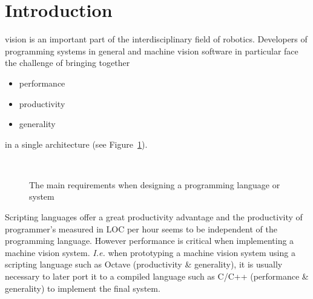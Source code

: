 \documentclass[10pt,journal,compsoc]{joser1}
\newcommand{\fig}[1]{Figure~\ref{fig:#1}}
\begin{document}
\maketitle

\section{Introduction}
 vision is an important part of the interdisciplinary
field of robotics. Developers of programming systems in general and machine
vision software in particular face the challenge of bringing together
\begin{itemize}
  \item performance
  \item productivity
  \item generality
\end{itemize}
in a single architecture (see \fig{triangle}).
\begin{figure}[htbp]
   \begin{center}
     \\
     \caption{The main requirements when designing a programming language or
     system \citep{wolczko2011}\label{fig:triangle}}
   \end{center}
\end{figure}

Scripting languages offer a great productivity advantage and the productivity
of programmer's measured in \ac{LOC} per hour seems to be independent of the
programming language\citep{prechelt2000empirical}. However performance is
critical when implementing a machine vision system. \emph{I.e.} when
prototyping a machine vision system using a scripting language such as Octave
(productivity \& generality), it is usually necessary to later port it to a
compiled language such as C/C++ (performance \& generality) to implement the
final system.
\end{document}
